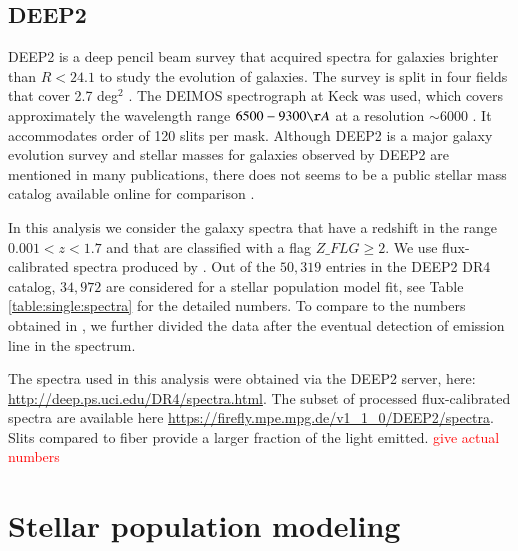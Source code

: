 \documentclass[onecolumn]{aa}
\begin{document}
\subsection{DEEP2}
DEEP2 is a deep pencil beam survey that acquired spectra for galaxies brighter than $R<24.1$ to study the evolution of galaxies. The survey is split in four fields that cover 2.7 deg$^2$  \citep{Newman_2013}. 
The DEIMOS spectrograph at Keck was used, which covers approximately the wavelength range $6500-9300\AA$ at a resolution $\sim$6000 \citep{Faber2003}. It accommodates order of 120 slits per mask. 
Although DEEP2 is a major galaxy evolution survey and stellar masses for galaxies observed by DEEP2 are mentioned in many publications, there does not seems to be a public stellar mass catalog available online for comparison \citep{kassin2007,covington2010,mostek2013,2017ApJ...838...87C}. 

In this analysis we consider the galaxy spectra that have a redshift in the range $0.001<z<1.7$ and that are classified with a flag $Z\_FLG\geq2$.
We use flux-calibrated spectra produced by \citet{Comparat2016LFs}. 
Out of the $50,319$ entries in the DEEP2 DR4 catalog, $34,972$ are considered for a stellar population model fit, see Table \ref{table:single:spectra} for the detailed numbers. 
To compare to the numbers obtained in \citet{Comparat2016LFs}, we further divided the data after the eventual detection of emission line in the spectrum. 


The spectra used in this analysis were obtained via the DEEP2 server, here: \url{http://deep.ps.uci.edu/DR4/spectra.html}. 
The subset of processed flux-calibrated spectra are available here \url{https://firefly.mpe.mpg.de/v1_1_0/DEEP2/spectra}. Slits compared to fiber provide a larger fraction of the light emitted. \textcolor{red}{give actual numbers}

\section{Stellar population modeling}
\label{sec:SPS}
\end{document}
